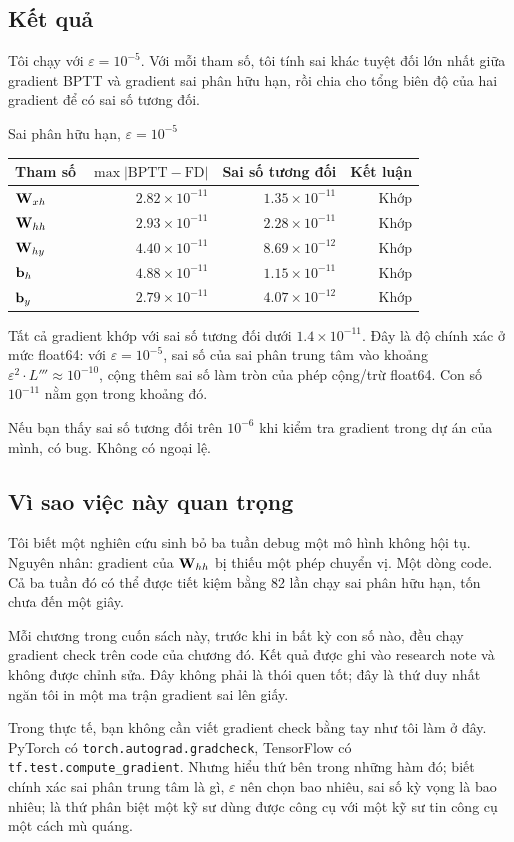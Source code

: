 \subsection{Kết quả}

Tôi chạy với $\varepsilon = 10^{-5}$. Với mỗi tham số, tôi tính sai khác tuyệt
đối lớn nhất giữa gradient BPTT và gradient sai phân hữu hạn, rồi chia cho
tổng biên độ của hai gradient để có sai số tương đối.

\begin{measured}{Sai phân hữu hạn, $\varepsilon = 10^{-5}$}
\small
\begin{tabular}{@{}lrrr@{}}
\toprule
Tham số & $\max|\text{BPTT} - \text{FD}|$ & Sai số tương đối & Kết luận \\
\midrule
$\mathbf{W}_{xh}$ & $2.82 \times 10^{-11}$ & $1.35 \times 10^{-11}$ & Khớp \\
$\mathbf{W}_{hh}$ & $2.93 \times 10^{-11}$ & $2.28 \times 10^{-11}$ & Khớp \\
$\mathbf{W}_{hy}$ & $4.40 \times 10^{-11}$ & $8.69 \times 10^{-12}$ & Khớp \\
$\mathbf{b}_h$   & $4.88 \times 10^{-11}$ & $1.15 \times 10^{-11}$ & Khớp \\
$\mathbf{b}_y$   & $2.79 \times 10^{-11}$ & $4.07 \times 10^{-12}$ & Khớp \\
\bottomrule
\end{tabular}
\normalsize
\end{measured}

Tất cả gradient khớp với sai số tương đối dưới $1.4 \times 10^{-11}$. Đây là
độ chính xác ở mức float64: với $\varepsilon = 10^{-5}$, sai số của sai phân
trung tâm vào khoảng $\varepsilon^2 \cdot L''' \approx 10^{-10}$, cộng thêm
sai số làm tròn của phép cộng/trừ float64. Con số $10^{-11}$ nằm gọn trong
khoảng đó.

Nếu bạn thấy sai số tương đối trên $10^{-6}$ khi kiểm tra gradient trong dự
án của mình, có bug. Không có ngoại lệ.

\subsection{Vì sao việc này quan trọng}

Tôi biết một nghiên cứu sinh bỏ ba tuần debug một mô hình không hội tụ.
Nguyên nhân: gradient của $\mathbf{W}_{hh}$ bị thiếu một phép chuyển vị.
Một dòng code. Cả ba tuần đó có thể được tiết kiệm bằng 82 lần chạy sai
phân hữu hạn, tốn chưa đến một giây.

Mỗi chương trong cuốn sách này, trước khi in bất kỳ con số nào, đều chạy
gradient check trên code của chương đó. Kết quả được ghi vào research note
và không được chỉnh sửa. Đây không phải là thói quen tốt; đây là thứ duy
nhất ngăn tôi in một ma trận gradient sai lên giấy.

Trong thực tế, bạn không cần viết gradient check bằng tay như tôi làm ở đây.
PyTorch có \texttt{torch.autograd.gradcheck}, TensorFlow có
\texttt{tf.test.compute_gradient}. Nhưng hiểu thứ bên trong
những hàm đó; biết chính xác sai phân trung tâm là gì, $\varepsilon$ nên
chọn bao nhiêu, sai số kỳ vọng là bao nhiêu; là thứ phân biệt một kỹ sư
dùng được công cụ với một kỹ sư tin công cụ một cách mù quáng.
